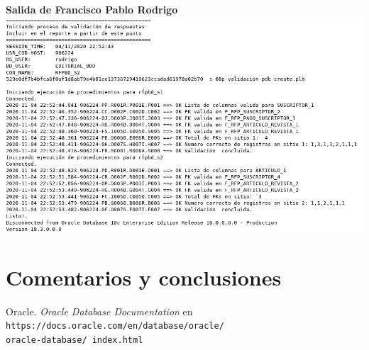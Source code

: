 \documentclass{article}
\begin{document}
\textbf{Salida de Francisco Pablo Rodrigo}\\
\includegraphics[width=\linewidth]{bdd_prac05-validador-rodrigo}


\section*{Comentarios y conclusiones}


\renewcommand\refname{Bibliografía}
\begin{thebibliography}{99}
     Oracle. \textit{Oracle Database Documentation} en 
        \texttt{https://docs.oracle.com/en/database/oracle/\\oracle-database/%
        index.html}
\end{thebibliography}
\end{document}
